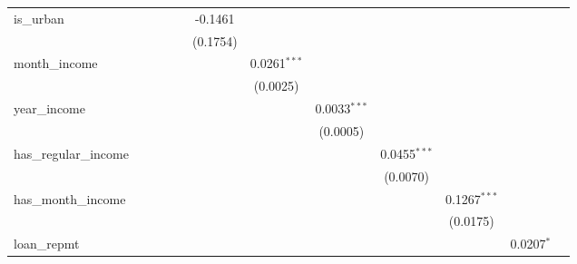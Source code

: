\begin{table}[htbp]
\begin{tiny}
\begin{tabular}{lccccccccccc}
         is\_urban              &                 &                 &                 &                 & -0.1461         &                 &                 &                 &                 &                 &   \\
                                 &                 &                 &                 &                 & (0.1754)        &                 &                 &                 &                 &                 &   \\
         month\_income          &                 &                 &                 &                 &                 & 0.0261$^{***}$  &                 &                 &                 &                 &   \\
                                 &                 &                 &                 &                 &                 & (0.0025)        &                 &                 &                 &                 &   \\
         year\_income           &                 &                 &                 &                 &                 &                 & 0.0033$^{***}$  &                 &                 &                 &   \\
                                 &                 &                 &                 &                 &                 &                 & (0.0005)        &                 &                 &                 &   \\
         has\_regular\_income  &                 &                 &                 &                 &                 &                 &                 & 0.0455$^{***}$  &                 &                 &   \\
                                 &                 &                 &                 &                 &                 &                 &                 & (0.0070)        &                 &                 &   \\
         has\_month\_income    &                 &                 &                 &                 &                 &                 &                 &                 & 0.1267$^{***}$  &                 &   \\
                                 &                 &                 &                 &                 &                 &                 &                 &                 & (0.0175)        &                 &   \\
         loan\_repmt            &                 &                 &                 &                 &                 &                 &                 &                 &                 & 0.0207$^{*}$    &   \\

\end{tabular}
\end{tiny}
\end{table}
